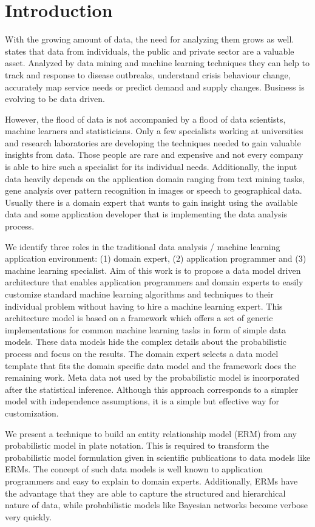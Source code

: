 \section{Introduction}

With the growing amount of data, the need for analyzing them grows as well. \textcite{forum2012bigdata} states that data from individuals, the public and private sector are a valuable asset. Analyzed by data mining and machine learning techniques they can help to track and response to disease outbreaks, understand crisis behaviour change, accurately map service needs or predict demand and supply changes. Business is evolving to be data driven.

However, the flood of data is not accompanied by a flood of data scientists, machine learners and statisticians. Only a few specialists working at universities and research laboratories are developing the techniques needed to gain valuable insights from data. Those people are rare and expensive and not every company is able to hire such a specialist for its individual needs. Additionally, the input data heavily depends on the application domain ranging from text mining tasks, gene analysis over pattern recognition in images or speech to geographical data. Usually there is a domain expert that wants to gain insight using the available data and some application developer that is implementing the data analysis process.

We identify three roles in the traditional data analysis / machine learning application environment: (1) domain expert, (2) application programmer and (3) machine learning specialist. Aim of this work is to propose a data model driven architecture that enables application programmers and domain experts to easily customize standard machine learning algorithms and techniques to their individual problem without having to hire a machine learning expert. This architecture model is based on a framework which offers a set of generic implementations for common machine learning tasks in form of simple data models. These data models hide the complex details about the probabilistic process and focus on the results. The domain expert selects a data model template that fits the domain specific data model and the framework does the remaining work. Meta data not used by the probabilistic model is incorporated after the statistical inference. Although this approach corresponds to a simpler model with independence assumptions, it is a simple but effective way for customization.

We present a technique to build an entity relationship model (ERM) from any probabilistic model in plate notation. This is required to transform the probabilistic model formulation given in scientific publications to data models like ERMs. The concept of such data models is well known to application programmers and easy to explain to domain experts. Additionally, ERMs have the advantage that they are able to capture the structured and hierarchical nature of data, while probabilistic models like Bayesian networks become verbose very quickly.

